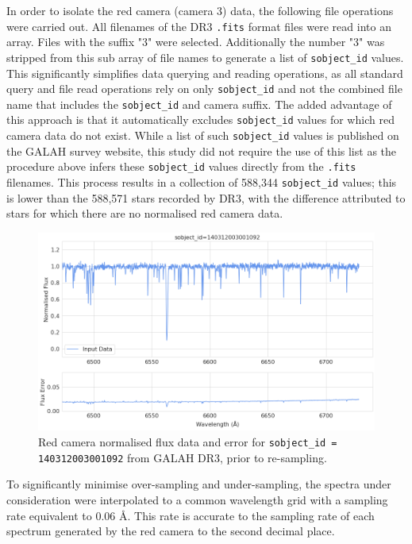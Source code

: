 In order to isolate the red camera (camera 3) data, the following file operations were carried out. All filenames of the DR3 \texttt{.fits} format files were read into an array. Files with the suffix "3" were selected. Additionally the number "3" was stripped from this sub array of file names to generate a list of \texttt{sobject\_id} values. This significantly simplifies data querying and reading operations, as all standard query and file read operations rely on only \texttt{sobject\_id} and not the combined file name that includes the \texttt{sobject\_id} and camera suffix. The added advantage of this approach is that it automatically excludes \texttt{sobject\_id} values for which red camera data do not exist. While a list of such \texttt{sobject\_id} values is published on the GALAH survey website, this study did not require the use of this list as the procedure above infers these \texttt{sobject\_id} values directly from the \texttt{.fits} filenames. This process results in a collection of 588,344 \texttt{sobject\_id} values; this is lower than the 588,571 stars recorded by DR3, with the difference attributed to stars for which there are no normalised red camera data. 

\begin{figure}[!htb]
\centering
\includegraphics[scale=.45]{figures/input spectrum.png}
\caption{Red camera normalised flux data and error for \texttt{sobject\_id = 140312003001092} from GALAH DR3, prior to re-sampling.}
\end{figure}

To significantly minimise over-sampling and under-sampling, the spectra under consideration were interpolated to a common wavelength grid with a sampling rate equivalent to 0.06 \r{A}. This rate is accurate to the sampling rate of each spectrum generated by the red camera to the second decimal place.

